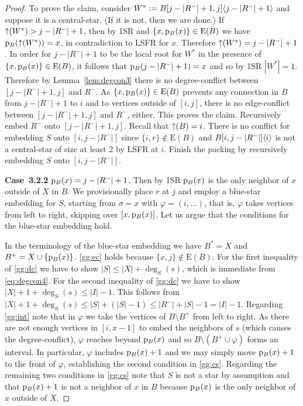 \documentclass[11pt,a4paper,colorlinks=true,urlcolor=blue,citecolor=red]{article}
\theoremstyle{plain}
\newcommand{\case}[1]{\par\vspace{.5\baselineskip}\noindent\textbf{\sffamily Case~#1}}
\newcommand{\EB}{\mathrm{E}(B)}
\begin{document}
\begin{proof}
  To prove the claim, consider $W^*:=B{[j-|R^-|+1,j]}\langle{j-|R^-|+1}\rangle$
  and suppose it is a central-star. (If it is not, then we are done.) If
  $\mathop{\uparrow}(W^*)>j-|R^-|+1$, then by 1SR and $\{x,\p_B(x)\}\in\EB$ we
  have $\mathrm p_B(\mathop{\uparrow}(W^*))=x$, in contradiction to LSFR for $x$.
  Therefore $\mathop{\uparrow}(W^*)=j-|R^-|+1$. In order for $j-|R^-|+1$ to be the
  local root for $W^*$ in the presence of $\{x,\p_B(x)\}\in\EB$, it
  follows that $\mathrm p_B(j-|R^-|+1)=x$ and so by 1SR $|W^*|=1$. Therefore by
  Lemma~\ref{lem:degcon3} there is no degree-conflict between
  $[j-|R^-|+1,j]$ and $R^-$. As $\{x,\p_B(x)\}\in\EB$ prevents any
  connection in $B$ from $j-|R^-|+1$ to $i$ and to vertices outside of
  $[i,j]$, there is no edge-conflict between $[j-|R^-|+1,j]$ and $R^-$,
  either. This proves the claim. Recursively embed $R^-$ onto
  $[j-|R^-|+1,j]$. Recall that $\mathop{\uparrow}(B)=i$. There is no conflict for
  embedding $S$ onto $[i,j-|R^-|]$ since $\{i,r\}\not\in\EB$ and
  $B{[i,j-|R^-|]}\langle{i}\rangle$ is not a central-star of size at least 2 by
  LSFR at $i$. Finish the packing by recursively embedding $S$ onto
  $[i,j-|R^-|]$.

  \case{3.2.2} $\mathrm p_B(x)=j-|R^-|+1$. Then by 1SR $\mathrm p_B(x)$ is the only
  neighbor of $x$ outside of $X$ in $B$. We provisionally place $r$ at
  $j$ and employ a blue-star embedding for $S$, starting from
  $\sigma=x$ with $\varphi=(i,\ldots)$, that is, $\varphi$ takes
  vertices from left to right, skipping over $[x,\mathrm p_B(x)]$. Let us argue
  that the conditions for the blue-star embedding hold.

  In the terminology of the blue-star embedding we have $B^*=X$ and
  $B^+=X\cup\{\mathrm p_B(x)\}$. \ref{gg:ec} holds because
  $\{x,j\}\notin\EB$. For the first inequality of \ref{gg:dc} we have to
  show $|S|\le|X|+\deg_S(s)$, which is immediate from
  \eqref{eq:degcon4}. For the second inequality of \ref{gg:dc} we have
  to show $|X|+1+\deg_S(s)\le|I|-1$. This follows from
  $|X|+1+\deg_S(s)\le|S|+(|S|-1)\le|R^-|+|S|-1=|I|-1$. Regarding
  \ref{gg:int} note that in $\varphi$ we take the vertices of
  $B\setminus B^+$ from left to right. As there are not enough vertices
  in $[i,x-1]$ to embed the neighbors of $s$ (which causes the
  degree-conflict), $\varphi$ reaches beyond $\mathrm p_B(x)$ and so
  $B\setminus(B^+\cup\varphi)$ forms an interval. In particular,
  $\varphi$ includes $\mathrm p_B(x)+1$ and we may simply move $\mathrm p_B(x)+1$ to
  the front of $\varphi$, establishing the second condition in
  \ref{gg:cs}. Regarding the remaining two conditions in
  \ref{gg:cs} note that $S$ is not a star by assumption and that $\mathrm p_B(x)+1$ is not
  a neighbor of $x$ in $B$ because $\mathrm p_B(x)$ is the only neighbor of $x$
  outside of $X$.


\end{proof}
\end{document}
